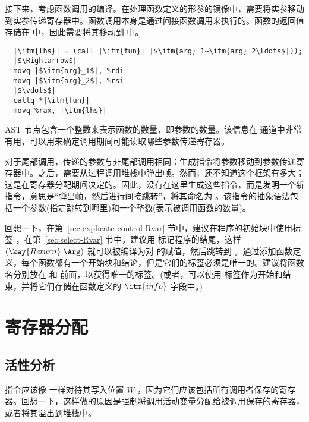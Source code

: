 \documentclass[11pt]{book}
\begin{document}
接下来，考虑函数调用的编译。在处理函数定义的形参的镜像中，需要将实参移动到实参传递寄存器中。函数调用本身是通过间接函数调用来执行的。函数的返回值存储在  中，因此需要将其移动到  中。
\begin{lstlisting}
  |\itm{lhs}| = (call |\itm{fun}| |$\itm{arg}_1~\itm{arg}_2\ldots$|));
  |$\Rightarrow$|
  movq |$\itm{arg}_1$|, %rdi
  movq |$\itm{arg}_2$|, %rsi
  |$\vdots$|
  callq *|\itm{fun}|
  movq %rax, |\itm{lhs}|
\end{lstlisting}
  AST 节点包含一个整数来表示函数的数量，即参数的数量。该信息在  通道中非常有用，可以用来确定调用期间可能读取哪些参数传递寄存器。

对于尾部调用，传递的参数与非尾部调用相同：生成指令将参数移动到参数传递寄存器中。之后，需要从过程调用堆栈中弹出帧。然而，还不知道这个框架有多大；这是在寄存器分配期间决定的。因此，没有在这里生成这些指令，而是发明一个新指令，意思是“弹出帧，然后进行间接跳转”，将其命名为
 。该指令的抽象语法包括一个参数(指定跳转到哪里)和一个整数(表示被调用函数的数量)。

回想一下，在第~\ref{sec:explicate-control-Rvar} 节中，建议在程序的初始块中使用标签  ，在第~\ref{sec:select-Rvar} 节中，建议用  标记程序的结尾，这样 $(\key{Return}\;\Arg)$
就可以被编译为对  的赋值，然后跳转到
 。通过添加函数定义，每个函数都有一个开始块和结论，但是它们的标签必须是唯一的。建议将函数名分别放在  和  前面，以获得唯一的标签。(或者，可以使用  标签作为开始和结束，并将它们存储在函数定义的 $\itm{info}$ 字段中。)


\section{寄存器分配}
\label{sec:register-allocation-r4}


\subsection{活性分析}
\label{sec:liveness-analysis-r4}


  指令应该像
 一样对待其写入位置 $W$ ，因为它们应该包括所有调用者保存的寄存器。回想一下，这样做的原因是强制将调用活动变量分配给被调用保存的寄存器，或者将其溢出到堆栈中。
\end{document}
